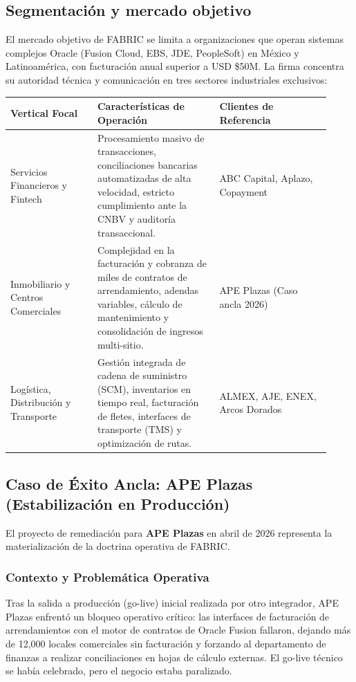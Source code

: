 \documentclass[11pt,letterpaper]{article}
\begin{document}
\subsection{Segmentación y mercado objetivo}
El mercado objetivo de FABRIC se limita a organizaciones que operan sistemas complejos Oracle (Fusion Cloud, EBS, JDE, PeopleSoft) en México y Latinoamérica, con facturación anual superior a USD \$50M. La firma concentra su autoridad técnica y comunicación en tres sectores industriales exclusivos:

\begin{longtable}{p{0.25\linewidth}p{0.35\linewidth}p{0.32\linewidth}}
\toprule
\textbf{Vertical Focal} & \textbf{Características de Operación} & \textbf{Clientes de Referencia} \\
\midrule
Servicios Financieros y Fintech & Procesamiento masivo de transacciones, conciliaciones bancarias automatizadas de alta velocidad, estricto cumplimiento ante la CNBV y auditoría transaccional. & ABC Capital, Aplazo, Copayment \\
\midrule
Inmobiliario y Centros Comerciales & Complejidad en la facturación y cobranza de miles de contratos de arrendamiento, adendas variables, cálculo de mantenimiento y consolidación de ingresos multi-sitio. & APE Plazas (Caso ancla 2026) \\
\midrule
Logística, Distribución y Transporte & Gestión integrada de cadena de suministro (SCM), inventarios en tiempo real, facturación de fletes, interfaces de transporte (TMS) y optimización de rutas. & ALMEX, AJE, ENEX, Arcos Dorados \\
\bottomrule
\end{longtable}

\subsection{Caso de Éxito Ancla: APE Plazas (Estabilización en Producción)}
El proyecto de remediación para \textbf{APE Plazas} en abril de 2026 representa la materialización de la doctrina operativa de FABRIC. 

\subsubsection{Contexto y Problemática Operativa}
Tras la salida a producción (go-live) inicial realizada por otro integrador, APE Plazas enfrentó un bloqueo operativo crítico: las interfaces de facturación de arrendamientos con el motor de contratos de Oracle Fusion fallaron, dejando más de 12,000 locales comerciales sin facturación y forzando al departamento de finanzas a realizar conciliaciones en hojas de cálculo externas. El go-live técnico se había celebrado, pero el negocio estaba paralizado.
\end{document}
